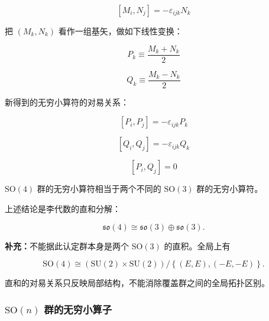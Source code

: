 \begin{equation}
\left[M_i,N_j \right] = -\varepsilon_{ijk}N_k
\end{equation}

把 $\left(M_k,N_k \right)$ 看作一组基矢，做如下线性变换：

\begin{equation}
P_k
\equiv \frac{M_k+N_k }{2 }
\end{equation}

\begin{equation}
Q_k
\equiv \frac{M_k-N_k }{2 }
\end{equation}

新得到的无穷小算符的对易关系：

\begin{equation}
\left[P_i,P_j \right] = -\varepsilon_{ijk}P_k
\end{equation}

\begin{equation}
\left[Q_i,Q_j \right] = -\varepsilon_{ijk}Q_k
\end{equation}

\begin{equation}
\left[P_i,Q_j \right] = 0
\end{equation}

$\mathrm{SO}\left(4\right)$ 群的无穷小算符相当于两个不同的 $\mathrm{SO}\left(3\right)$ 群的无穷小算符。

上述结论是李代数的直和分解：

\begin{equation}
\mathfrak{so}\left(4\right)\cong\mathfrak{so}\left(3\right)\oplus\mathfrak{so}\left(3\right).
\end{equation}

\textbf{补充：}不能据此认定群本身是两个 $\mathrm{SO}\left(3\right)$ 的直积。全局上有

\begin{equation}
\mathrm{SO}\left(4\right)\cong\left(\mathrm{SU}\left(2\right)\times\mathrm{SU}\left(2\right)\right)/\left\{\left(E,E\right),\left(-E,-E\right)\right\}.
\end{equation}

直和的对易关系只反映局部结构，不能消除覆盖群之间的全局拓扑区别。

\subsubsection*{\texorpdfstring{$\mathrm{SO}\left(n\right)$ 群的无穷小算子}{SO(n) 群的无穷小算子}}

